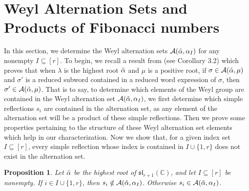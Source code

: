 \documentclass[10pt]{article}
\newtheorem{proposition}[theorem]{Proposition}
\newcommand{\speclin}[0]{\mathfrak{sl}_{r+1}(\mathbb{C})}
\newcommand{\hr}[0]{\Tilde{\alpha}}
\newcommand{\newmu}[0]{\alpha_I}
\newcommand{\thealtset}[0]{\mathcal{A}(\hr,\newmu)}
\begin{document}
\section{Weyl Alternation Sets and Products of Fibonacci numbers}\label{section: 2 Weyl alt sets}
In this section, we determine the Weyl alternation sets $\thealtset$ for any nonempty $I\subseteq [r]$. To begin, we recall a result from
\cite{anderson2025supportkostantsweightmultiplicity} (see Corollary 3.2)
which proves that when $\lambda$ is the highest root $\hr$ and $\mu$ is a positive root, if $\sigma\in \mathcal{A}(\hr,\mu)$ and $\sigma'$ is a reduced subword contained in a reduced word expression of $\sigma$, then $\sigma'\in\mathcal{A}(\hr,\mu)$. That is to say, to determine which elements of the Weyl group are contained in the Weyl alternation set $\mathcal{A}(\hr,\alpha_I)$, we first determine which simple reflections $s_i$ are contained in the alternation set, as any element of the alternation set will be a product of these simple reflections. Then we prove some properties pertaining to the structure of these Weyl alternation set elements which help in our characterization. 
Now we show that, for a given index set $I\subseteq[r]$, every simple reflection whose index is contained in $I\cup \{1,r\}$ does not exist in the alternation set.
\begin{proposition}\label{prop: no s1 sr}
    Let $\hr$ be the highest root of $\speclin$, and let $I\subseteq [r]$ be nonempty. 
    If $i\in I\cup\{1,r\}$, then $s_i\notin\mathcal{A}(\hr,\alpha_I)$. 
    Otherwise $s_i\in\thealtset$.
\end{proposition}
\end{document}
